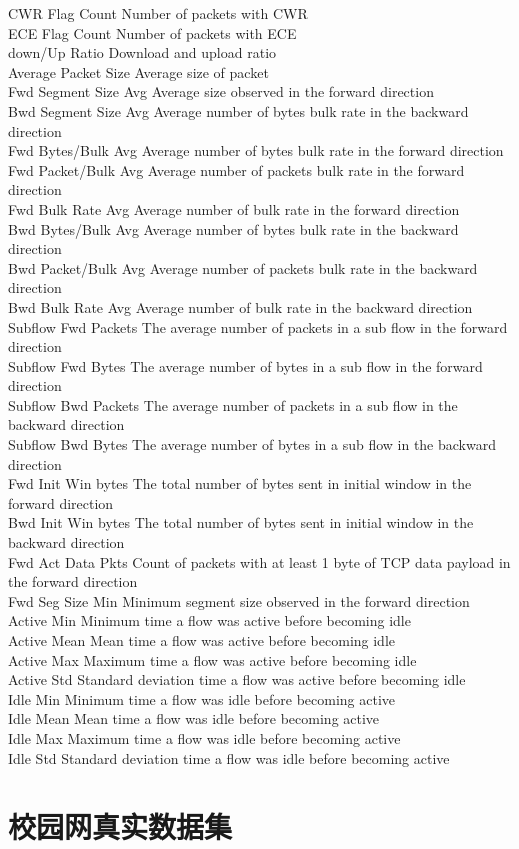 CWR Flag Count 			Number of packets with CWR \\
ECE Flag Count 			Number of packets with ECE \\
down/Up Ratio			Download and upload ratio \\
Average Packet Size 		Average size of packet \\
Fwd Segment Size Avg 		Average size observed in the forward direction \\
Bwd Segment Size Avg 		Average number of bytes bulk rate in the backward direction \\
Fwd Bytes/Bulk Avg		Average number of bytes bulk rate in the forward direction \\
Fwd Packet/Bulk Avg		Average number of packets bulk rate in the forward direction \\
Fwd Bulk Rate Avg 		Average number of bulk rate in the forward direction \\
Bwd Bytes/Bulk Avg		Average number of bytes bulk rate in the backward direction \\
Bwd Packet/Bulk Avg 		Average number of packets bulk rate in the backward direction \\
Bwd Bulk Rate Avg		Average number of bulk rate in the backward direction \\
Subflow Fwd Packets		The average number of packets in a sub flow in the forward direction \\
Subflow Fwd Bytes		The average number of bytes in a sub flow in the forward direction \\
Subflow Bwd Packets		The average number of packets in a sub flow in the backward direction \\
Subflow Bwd Bytes		The average number of bytes in a sub flow in the backward direction \\
Fwd Init Win bytes		The total number of bytes sent in initial window in the forward direction \\
Bwd Init Win bytes		The total number of bytes sent in initial window in the backward direction \\
Fwd Act Data Pkts		Count of packets with at least 1 byte of TCP data payload in the forward direction \\
Fwd Seg Size Min		Minimum segment size observed in the forward direction \\
Active Min			Minimum time a flow was active before becoming idle \\
Active Mean			Mean time a flow was active before becoming idle \\
Active Max			Maximum time a flow was active before becoming idle \\
Active Std			Standard deviation time a flow was active before becoming idle \\
Idle Min			Minimum time a flow was idle before becoming active \\
Idle Mean			Mean time a flow was idle before becoming active \\
Idle Max			Maximum time a flow was idle before becoming active \\
Idle Std			Standard deviation time a flow was idle before becoming active \\
\section{校园网真实数据集}
